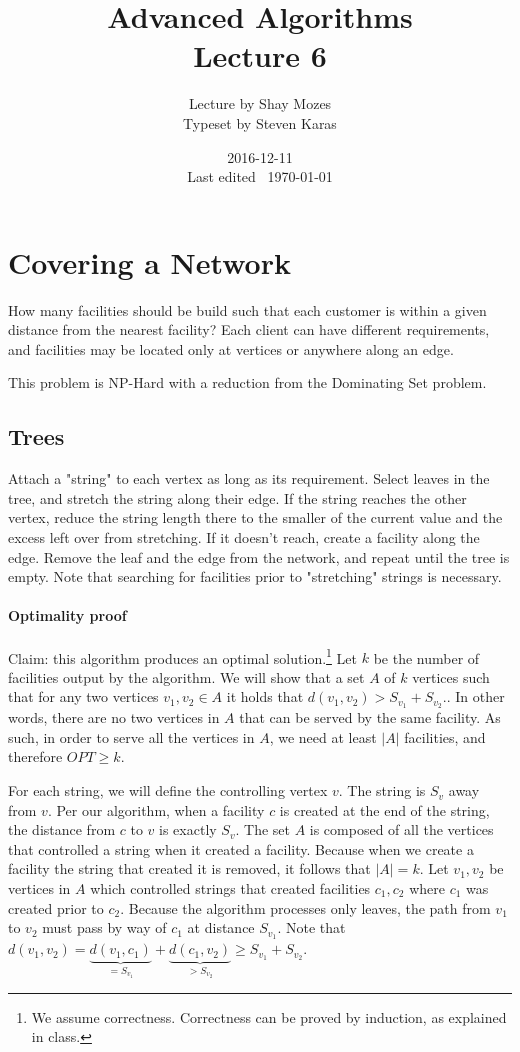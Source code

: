 \documentclass[a4paper]{article}
\title{Advanced Algorithms\\\large Lecture 6}
\date{2016-12-11 \\ Last edited \currenttime\ \today}
\author{Lecture by Shay Mozes\\Typeset by Steven Karas}
\begin{document}
\maketitle

\section{Covering a Network}
How many facilities should be build such that each customer is within a given distance from the nearest facility? Each client can have different requirements, and facilities may be located only at vertices or anywhere along an edge.

This problem is NP-Hard with a reduction from the Dominating Set problem.

\subsection{Trees}
Attach a "string" to each vertex as long as its requirement. Select leaves in the tree, and stretch the string along their edge. If the string reaches the other vertex, reduce the string length there to the smaller of the current value and the excess left over from stretching. If it doesn't reach, create a facility along the edge. Remove the leaf and the edge from the network, and repeat until the tree is empty. Note that searching for facilities prior to "stretching" strings is necessary.

\paragraph{Optimality proof}
Claim: this algorithm produces an optimal solution.\footnote{We assume correctness. Correctness can be proved by induction, as explained in class.}
Let $k$ be the number of facilities output by the algorithm. We will show that a set $A$ of $k$ vertices such that for any two vertices $v_1,v_2\in A$ it holds that $d(v_1,v_2)> S_{v_1} + S_{v_2}$.. In other words, there are no two vertices in $A$ that can be served by the same facility. As such, in order to serve all the vertices in $A$, we need at least $|A|$ facilities, and therefore $OPT\ge k$.

For each string, we will define the controlling vertex $v$. The string is $S_v$ away from $v$. Per our algorithm, when a facility $c$ is created at the end of the string, the distance from $c$ to $v$ is exactly $S_v$.
The set $A$ is composed of all the vertices that controlled a string when it created a facility.
Because when we create a facility the string that created it is removed, it follows that $|A|=k$.
Let $v_1,v_2$ be vertices in $A$ which controlled strings that created facilities $c_1,c_2$ where $c_1$ was created prior to $c_2$. Because the algorithm processes only leaves, the path from $v_1$ to $v_2$ must pass by way of $c_1$ at distance $S_{v_1}$. Note that $d(v_1,v_2)=\underbrace{d(v_1,c_1)}_{=S_{v_1}}+\underbrace{d(c_1,v_2)}_{>S_{v_2}} \ge S_{v_1}+S_{v_2}$.
\end{document}
